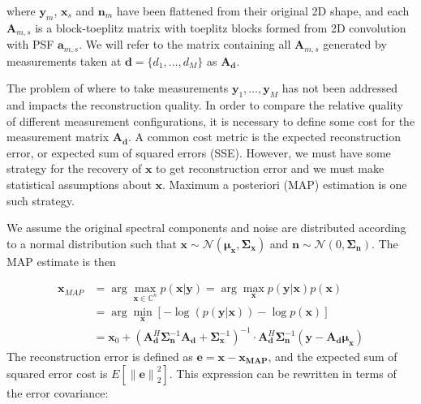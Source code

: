 \documentclass{article}
\providecommand{\norm}[1]{\left\lVert#1\right\rVert}
\begin{document}

where $\bm{y}_m$, $\bm{x}_s$ and $\bm{n}_m$ have been flattened from their
original 2D shape, and each $\bm{A}_{m,s}$ is a block-toeplitz
matrix with toeplitz blocks formed from 2D convolution with PSF $\bm{a}_{m,s}$.
We will refer to the matrix containing all $\bm{A}_{m,s}$
generated by measurements taken at $\bm{d} = \{d_1, \dots, d_M\}$ as
$\bm{A}_{\bm{d}}$.

The problem of where to take measurements $\bm{y}_1, \dots, \bm{y}_M$ has not
been addressed and impacts the reconstruction quality.  In order to
compare the relative quality of different measurement configurations, it is
necessary to define some cost for the measurement matrix $\bm{A}_{\bm{d}}$.  A common cost
metric is the expected reconstruction error, or expected sum of squared errors
(SSE). However, we must have some strategy for the recovery of $\bm{x}$ to get
reconstruction error and we must make statistical assumptions about $\bm{x}$.
Maximum a posteriori (MAP) estimation is one such strategy.

We assume the original spectral components and noise are distributed according to a
normal distribution such that $\bm{x} \sim \mathcal{N}(\bm{\mu}_{\bm{x}}, \bm{\Sigma}_{\bm{x}})$ and
$\bm{n} \sim \mathcal{N}(0, \bm{\Sigma}_{\bm{n}})$.  The MAP estimate is then

$$
\begin{aligned}
  \bm{x}_{MAP} &= \arg \max_{\bm{x} \in \mathbb{C}^n} p(\bm{x} | \bm{y})
  = \arg \max_{\bm{x}} p(\bm{y}|\bm{x}) p(\bm{x})\\
  &= \arg \min_{\bm{x}} \left[  - \log(p(\bm{y}|\bm{x})) - \log
  p(\bm{x})\right] \\
  &= \bm{x}_0 + \left( \bm{A}_{\bm{d}}^H\bm{\Sigma}_{\bm{n}}^{-1} \bm{A}_{\bm{d}} +
    \bm{\Sigma}_{\bm{x}}^{-1}\right)^{-1}
  \cdot  \bm{A}_{\bm{d}}^H \bm{\Sigma}_{\bm{n}}^{-1} (\bm{y} - \bm{A}_{\bm{d}} \bm{\mu}_{\bm{x}})
\end{aligned}
$$
The reconstruction error is defined as $\bm{e} = \bm{x} - \bm{x_{\text{MAP}}}$,
and the expected sum of squared error cost is $E[\norm{\bm{e}}_2^2]$. This
expression can be rewritten in terms of the error covariance:
\end{document}
